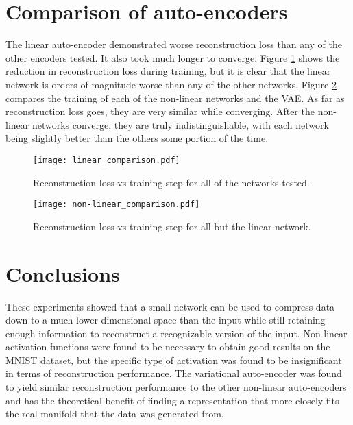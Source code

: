 \documentclass{article}
\begin{document}
\section{Comparison of auto-encoders}

The linear auto-encoder demonstrated worse reconstruction loss than any of the other encoders tested. It also took much longer to converge. Figure \ref{fig:all_convergence} shows the reduction in reconstruction loss during training, but it is clear that the linear network is orders of magnitude worse than any of the other networks. Figure \ref{fig:nonlinear_convergence} compares the training of each of the non-linear networks and the VAE. As far as reconstruction loss goes, they are very similar while converging. After the non-linear networks converge, they are truly indistinguishable, with each network being slightly better than the others some portion of the time. 

\begin{figure}[h]
\begin{center}
\texttt{[image: linear\_comparison.pdf]} 
\caption{Reconstruction loss vs training step for all of the networks tested.}
\label{fig:all_convergence}
\end{center}
\end{figure}

\begin{figure}[h]
\begin{center}
\texttt{[image: non-linear\_comparison.pdf]} 
\caption{Reconstruction loss vs training step for all but the linear network.}
\label{fig:nonlinear_convergence}
\end{center}
\end{figure}

\section{Conclusions}
These experiments showed that a small network can be used to compress data down to a much lower dimensional space than the input while still retaining enough information to reconstruct a recognizable version of the input. Non-linear activation functions were found to be necessary to obtain good results on the MNIST dataset, but the specific type of activation was found to be insignificant in terms of reconstruction performance. The variational auto-encoder was found to yield similar reconstruction performance to the other non-linear auto-encoders and has the theoretical benefit of finding a representation that more closely fits the real manifold that the data was generated from.
\end{document}
